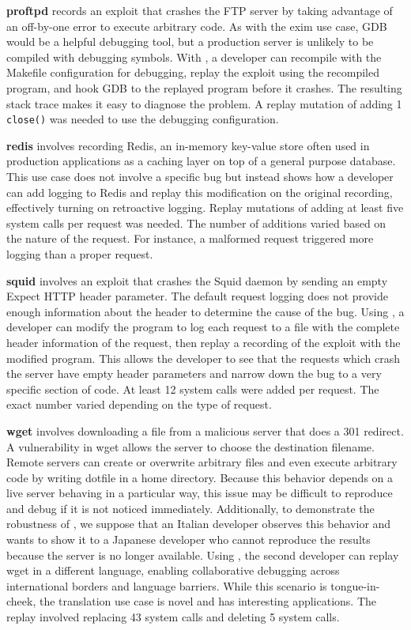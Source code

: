 {\bf proftpd} records an exploit that crashes the FTP server by taking
advantage of an off-by-one error to execute arbitrary code. As with the exim
use case, GDB would be a helpful debugging tool, but a production server is
unlikely to be compiled with debugging symbols. With {\dora}, a developer can
recompile
with the Makefile configuration for debugging, replay
the exploit using the recompiled program, and hook
GDB to the replayed program before it crashes. The resulting stack
trace makes it easy to diagnose the problem. A replay mutation of
adding 1 {\tt close()} was needed to use the debugging configuration.

{\bf redis} involves recording Redis, an in-memory key-value store often
used in production applications as a caching layer on top of a general purpose
database. This use case does not involve a specific bug but instead shows how a
developer can add logging to Redis and replay this modification on the original
recording, effectively turning on retroactive logging. Replay mutations of
adding at least
five system calls per request was needed. The number of additions varied
based on the nature of the request. For instance, a malformed request triggered
more logging than a proper request.

{\bf squid} involves an exploit that crashes the Squid daemon by sending an
empty Expect HTTP header parameter.
The default request logging does not provide enough information about the header to
determine the cause of the bug. Using {\dora}, a developer can
modify the program to log each request to a file with the complete
header information of the request, then replay a recording of the exploit with
the modified program. This allows the developer to see that the
requests which crash the server have empty header parameters and
narrow down the bug to a very specific section of code.
At least 12 system calls were added per request. The exact number varied
depending on the type of request.

{\bf wget} involves downloading a file from a malicious server
that does a 301 redirect. A vulnerability in wget allows the
server to choose the destination filename.
Remote servers can create or overwrite arbitrary files and even
execute arbitrary code by writing
dotfile in a home directory. Because this behavior depends on a live server
behaving in a particular way, this issue may be difficult to reproduce and debug
if it is not noticed immediately. Additionally, to
demonstrate the robustness of {\dora}, we suppose that an Italian developer
observes this behavior and wants to show it to a Japanese developer
who cannot reproduce the results because
the server is no longer available. Using {\dora}, the second
developer can replay wget in a different language, enabling
collaborative debugging across international borders and language
barriers. While this scenario is tongue-in-cheek,
the translation use case is novel and has interesting
applications. The replay involved replacing 43 system calls and deleting 5
system calls.

